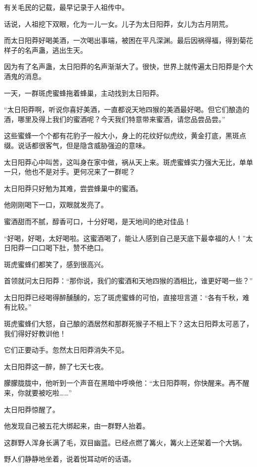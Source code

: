 
\begin{this_body}

有关毛民的记载，最早记录于人祖传中。

话说，人祖挖下双眼，化为一儿一女。儿子为太日阳莽，女儿为古月阴荒。

而太日阳莽好喝美酒，一次喝出事端，被困在平凡深渊。最后因祸得福，得到菊花样子的名声蛊，逃出生天。

因为有了名声蛊，太日阳莽的名声渐渐大了。很快，世界上就传遍太日阳莽是个大酒鬼的消息。

一天，一群斑虎蜜蜂拖着蜂巢，主动找到太日阳莽。

“太日阳莽啊，听说你喜好美酒，一直都说天地四猴的美酒最好喝。但它们酿造的酒，哪里及得上我们的蜜酒呢？今天我们特意带来蜜酒，请您品尝品尝。”

这些蜜蜂一个个都有花豹子一般大小，身上的花纹好似虎纹，黄金打底，黑斑点缀。说话都很客气，但是隐含威胁强迫的意味。

太日阳莽心中叫苦，这叫身在家中做，祸从天上来。斑虎蜜蜂实力强大无比，单单一只，他也不是对手。更何况来了一群呢？

太日阳莽只好勉为其难，尝尝蜂巢中的蜜酒。

他刚刚喝下一口，双眼就发亮了。

蜜酒甜而不腻，醇香可口，十分好喝，是天地间的绝对佳品！

“好喝，好喝，太好喝啦。这蜜酒喝了，能让人感到自己是天底下最幸福的人！”太日阳莽一口口喝下肚，赞不绝口。

斑虎蜜蜂们都笑了，感到很高兴。

首领就问太日阳莽：“那你说，我们的蜜酒和天地四猴的酒相比，谁更好喝一些？”

太日阳莽已经喝得醉醺醺的，忘了斑虎蜜蜂的可怕，直接坦言道：“各有千秋，难有比较。”

斑虎蜜蜂们大怒，自己酿的酒居然和那群死猴子不相上下？这太日阳莽太可恶了，我们得好好教训他！

它们正要动手。忽然太日阳莽消失不见。

太日阳莽这一醉，醉了七天七夜。

朦朦胧胧中，他听到一个声音在黑暗中呼唤他：“太日阳莽啊，你快醒来。再不醒来，你就要被吃啦……”

太日阳莽惊醒了。

他发现自己被五花大绑起来，由一群野人抬着。

这群野人浑身长满了毛，双目幽蓝。已经点燃了篝火，篝火上还架着一个大锅。

野人们静静地坐着，说着悦耳动听的话语。


\end{this_body}
